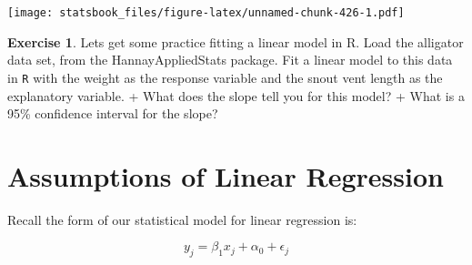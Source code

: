 \documentclass[
]{book}
\newenvironment{Shaded}{\begin{snugshade}}{\end{snugshade}}
\newcommand{\AttributeTok}[1]{\textcolor[rgb]{0.77,0.63,0.00}{#1}}
\newcommand{\DecValTok}[1]{\textcolor[rgb]{0.00,0.00,0.81}{#1}}
\newcommand{\FloatTok}[1]{\textcolor[rgb]{0.00,0.00,0.81}{#1}}
\newcommand{\FunctionTok}[1]{\textcolor[rgb]{0.00,0.00,0.00}{#1}}
\newcommand{\NormalTok}[1]{#1}
\newcommand{\OtherTok}[1]{\textcolor[rgb]{0.56,0.35,0.01}{#1}}
\newcommand{\SpecialCharTok}[1]{\textcolor[rgb]{0.00,0.00,0.00}{#1}}
\newcommand{\StringTok}[1]{\textcolor[rgb]{0.31,0.60,0.02}{#1}}
\theoremstyle{definition}
\theoremstyle{definition}
\theoremstyle{definition}
\newtheorem{exercise}{Exercise}[chapter]
\theoremstyle{definition}
\theoremstyle{remark}
\begin{document}
\begin{Shaded}
\end{Shaded}

\texttt{[image: statsbook\_files/figure-latex/unnamed-chunk-426-1.pdf]}

\begin{exercise}
\protect\hypertarget{exr:unnamed-chunk-427}{}\label{exr:unnamed-chunk-427}Lets get some practice fitting a linear model in R. Load the alligator data set, from the HannayAppliedStats package. Fit a linear model to this data in \texttt{R} with the weight as the response variable and the snout vent length as the explanatory variable.
+ What does the slope tell you for this model?
+ What is a 95\% confidence interval for the slope?
\end{exercise}

\hypertarget{assumptions-of-linear-regression}{%
\section{Assumptions of Linear Regression}\label{assumptions-of-linear-regression}}

Recall the form of our statistical model for linear regression is:

\[ y_j=\beta_1 x_j+\alpha_0+\epsilon_j \]
\end{document}
